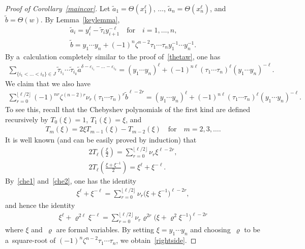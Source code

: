 \documentclass[pdftex]{sigma}
\numberwithin{equation}{section}
\begin{document}
\begin{proof}
[Proof of Corollary~\ref{maincor}] Let ${\widetilde{a}}_1 = \Theta(x_1^\ell)$, $\ldots$, ${\widetilde{a}}_n =
\Theta(x_n^\ell)$, and ${\widetilde{b}}=\Theta(w)$.
By Lemma~\ref{keylemma},
\begin{gather*}
{\widetilde{a}}_i = y_i^\ell - {\widetilde{\tau}}_i y_{i+1}^{-\ell}
\quad
\text{for}
\quad
i=1,\ldots, n,
\\
{\widetilde{b}} = y_1\cdots y_n + (-1)^n \zeta^{n-2} \tau_1\cdots \tau_n y_1^{-1} \cdots y_n^{-1}.
\end{gather*}
By a~calculation completely similar to the proof of~\eqref{thetaw}, one has
\begin{gather}
\label{leftside}
\sum\limits_{\{i_1<\dots<i_k\}\in J} {\widetilde{\tau}}_{i_1}\cdots {\widetilde{\tau}}_{i_k}
{\widetilde{a}}^{\delta-\varepsilon_{i_1} - \dots - \varepsilon_{i_k}} = (y_1 \cdots y_n)^\ell + (-1)^{n\ell}
(\tau_1\cdots \tau_n)^\ell (y_1\cdots y_n)^{-\ell}.
\end{gather}
We claim that we also have
\begin{gather}
\label{rightside}
\sum\limits_{r=0}^{\lfloor \ell/2 \rfloor} (-1)^{nr} \zeta^{(n-2)r} \nu_r (\tau_1\cdots \tau_n)^r
{\widetilde{b}}^{\ell-2r} = (y_1 \cdots y_n)^\ell + (-1)^{n\ell} (\tau_1\cdots \tau_n)^\ell (y_1\cdots y_n)^{-\ell}.
\end{gather}
To see this, recall that the Chebyshev polynomials of the f\/irst kind are def\/ined recursively by $T_0(\xi) = 1$,
$T_1(\xi) = \xi$, and
\begin{gather*}
T_m(\xi) = 2\xi T_{m-1}(\xi) - T_{m-2}(\xi)
\quad
\text{for}
\quad
m=2, 3, \ldots.
\end{gather*}
It is well known (and can be easily proved by induction) that
\begin{gather}
2 T_\ell \left(\frac{\xi}{2}\right) = \sum\limits_{r=0}^{\lfloor \ell/2 \rfloor} \nu_r \xi^{\ell-2r},
\label{che1}
\\
2T_\ell \left(\frac{\xi+ \xi^{-1}}{2}\right) = \xi^\ell + \xi^{-\ell}.
\label{che2}
\end{gather}
By~\eqref{che1} and~\eqref{che2}, one has the identity
\begin{gather*}
\xi^\ell + \xi^{-\ell} = \sum\limits_{r=0}^{\lfloor \ell/2 \rfloor} \nu_r \big(\xi+\xi^{-1}\big)^{\ell-2r},
\end{gather*}
and hence the identity
\begin{gather*}
\xi^\ell + \varrho^{2\ell} \xi^{-\ell} = \sum\limits_{r=0}^{\lfloor \ell/2 \rfloor} \nu_r \varrho^{2r} \big(\xi+\varrho^2
\xi^{-1}\big)^{\ell-2r}
\end{gather*}
where $\xi$ and~$\varrho$ are formal variables.
By setting $\xi=y_1\cdots y_n$ and choosing~$\varrho$ to be a~square-root of $(-1)^n \zeta^{n-2} \tau_1\cdots \tau_n$, we
obtain~\eqref{rightside}.


\end{proof}
\end{document}
